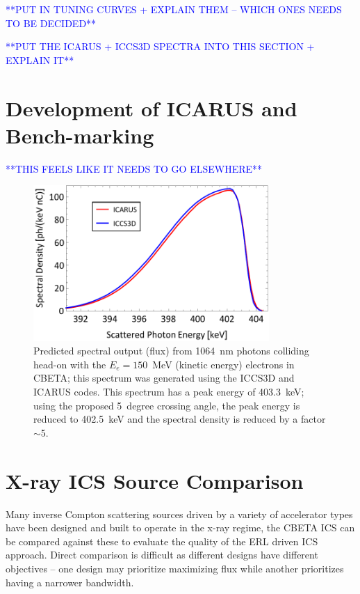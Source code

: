 \documentclass[../main.tex]{subfiles}
\begin{document}
\textcolor{blue}{**PUT IN TUNING CURVES + EXPLAIN THEM -- WHICH ONES NEEDS TO BE DECIDED**}

\textcolor{blue}{**PUT THE ICARUS + ICCS3D SPECTRA INTO THIS SECTION + EXPLAIN IT**}



\section{Development of ICARUS and Bench-marking}

\textcolor{blue}{**THIS FEELS LIKE IT NEEDS TO GO ELSEWHERE**}

\begin{figure}[!h]
\centering
\includegraphics[width=0.8\textwidth]{Figures/CBETA_Inverse_Compton_Source_Design/cbetaspectrumplot_final.pdf}
\caption{Predicted spectral output (flux) from 1064~nm photons colliding head-on with the $E_e =150$~MeV (kinetic energy) electrons in CBETA; this spectrum was generated using the \textsc{ICCS3D} and \textsc{ICARUS} codes. This spectrum has a peak energy of 403.3~keV; using the proposed 5~degree crossing angle, the peak energy is reduced to 402.5~keV and the spectral density is reduced by a factor $\sim$5.}
\label{fig:CBETA_spectrum_benchmarking}
\end{figure}

\section{X-ray ICS Source Comparison}
\label{sec:xray_ICS_comparison}

Many inverse Compton scattering sources driven by a variety of accelerator types have been designed and built to operate in the x-ray regime, the CBETA ICS can be compared against these to evaluate the quality of the ERL driven ICS approach. Direct comparison is difficult as different designs have different objectives -- one design may prioritize maximizing flux while another prioritizes having a narrower bandwidth.
\end{document}
